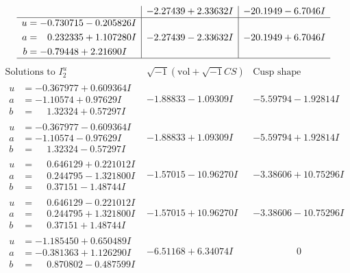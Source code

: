 \documentclass[1p]{elsarticle_modified}
\theoremstyle{definition}
\newcommand{\I}{\sqrt{-1}}
\begin{document}
$$\begin{array}{c|c|c}
 & -2.27439 + 2.33632 I & -20.1949 - 6.7046 I \\ \hline\begin{aligned}
u &= -0.730715 - 0.205826 I \\
a &= \phantom{-}0.232335 + 1.107280 I \\
b &= -0.79448 + 2.21690 I\end{aligned}
 & -2.27439 - 2.33632 I & -20.1949 + 6.7046 I\\
 \hline 
 \end{array}$$\newpage$$\begin{array}{c|c|c}  
\text{Solutions to }I^u_{2}& \I (\text{vol} + \sqrt{-1}CS) & \text{Cusp shape}\\
 \hline 
\begin{aligned}
u &= -0.367977 + 0.609364 I \\
a &= -1.10574 + 0.97629 I \\
b &= \phantom{-}1.32324 + 0.57297 I\end{aligned}
 & -1.88833 - 1.09309 I & -5.59794 - 1.92814 I \\ \hline\begin{aligned}
u &= -0.367977 - 0.609364 I \\
a &= -1.10574 - 0.97629 I \\
b &= \phantom{-}1.32324 - 0.57297 I\end{aligned}
 & -1.88833 + 1.09309 I & -5.59794 + 1.92814 I \\ \hline\begin{aligned}
u &= \phantom{-}0.646129 + 0.221012 I \\
a &= \phantom{-}0.244795 - 1.321800 I \\
b &= \phantom{-}0.37151 - 1.48744 I\end{aligned}
 & -1.57015 - 10.96270 I & -3.38606 + 10.75296 I \\ \hline\begin{aligned}
u &= \phantom{-}0.646129 - 0.221012 I \\
a &= \phantom{-}0.244795 + 1.321800 I \\
b &= \phantom{-}0.37151 + 1.48744 I\end{aligned}
 & -1.57015 + 10.96270 I & -3.38606 - 10.75296 I \\ \hline\begin{aligned}
u &= -1.185450 + 0.650489 I \\
a &= -0.381363 + 1.126290 I \\
b &= \phantom{-}0.870802 - 0.487599 I\end{aligned}
 & -6.51168 + 6.34074 I & \phantom{-0.000000 } 0 \\ \hline\begin{aligned}

\end{aligned}
\end{array}$$
\end{document}
